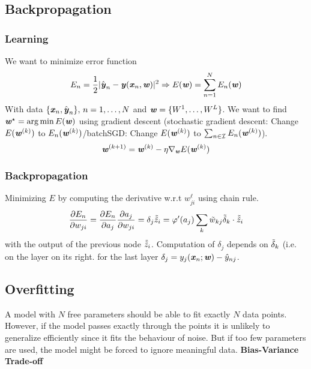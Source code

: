 \subsection{Backpropagation}
    \subsubsection{Learning}
        We want to minimize error function 
        \begin{equation*}
            E_n = \frac{1}{2}|\hat{\textbf{\textit{y}}}_n - \textbf{\textit{y}}(\textbf{\textit{x}}_n,\textbf{\textit{w}})|^2 \Rightarrow
            E(\textbf{\textit{w}}) = \sum_{n=1}^N E_n(\textbf{\textit{w}})
        \end{equation*}
        With data $\{\textbf{\textit{x}}_n, \hat{\textbf{\textit{y}}}_n\}, \, n = 1,\dots,N$ and $\textbf{\textit{w}} = \{W^1,\dots,W^L\}$. We want to find $\textbf{\textit{w}}^\star=\arg\min E(\textbf{\textit{w}})$ using gradient descent \Big(stochastic gradient descent: Change $E(\textbf{\textit{w}}^{(k)})$ to $E_n(\textbf{\textit{w}}^{(k)})$/batchSGD: Change $E(\textbf{\textit{w}}^{(k)})$ to $\sum_{n\in\mathcal{I}}E_n(\textbf{\textit{w}}^{(k)})$\Big).
        \begin{equation*}
            \textbf{\textit{w}}^{(k+1)} =\textbf{\textit{w}}^{(k)} - \eta\nabla_{\textbf{\textit{w}}}E(\textbf{\textit{w}}^{(k)})
        \end{equation*}
        
    \subsubsection{Backpropagation}
        Minimizing $E$ by computing the derivative w.r.t $w_{ji}^\ell$ using chain rule.
        \begin{equation*}
            \frac{\partial E_n}{\partial w_{ji}}= \frac{\partial E_n}{\partial a_j}\frac{\partial a_j}{\partial w_{ji}} = \delta_j \Tilde{\Tilde{z}}_i = \varphi'(a_j)\sum_k \Tilde{w}_{kj}\Tilde{\delta}_k \cdot \Tilde{\Tilde{z}}_i
        \end{equation*}
        with the output of the previous node $\Tilde{\Tilde{z}}_i$. Computation of $\delta_j$ depends on $\Tilde{\delta}_k$ (i.e. on the layer on its right. for the last layer $\delta_j = y_j(\textbf{\textit{x}}_n; \textbf{\textit{w}}) - \hat{y}_{nj}$.
    
\subsection{Overfitting}
    A model with $N$ free parameters should be able to fit exactly $N$ data points. However, if the model passes exactly through the points it is unlikely to generalize efficiently since it fits the behaviour of noise. But if too few parameters are used, the model might be forced to ignore meaningful data. \textbf{Bias-Variance Trade-off}